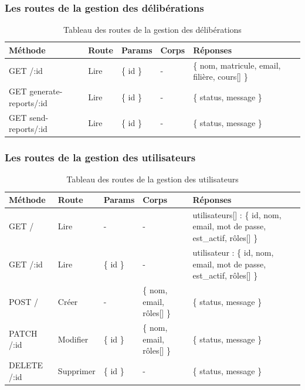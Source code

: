 \subsubsection*{Les routes de la gestion des délibérations}\label{subsec:routes-deliberation}

\begin{table}[ht]
  \caption{Tableau des routes de la gestion des délibérations}
  \label{tab:routes-deliberation}
  \begin{tabular}{|p{2cm}|p{1cm}|p{1cm}|p{1.5cm}|p{4cm}| }
    \hline
    Méthode & Route & Params & Corps & Réponses \\
    \hline
    GET /:id & Lire &  \{ id \} & - & \{ nom, matricule, email, filière, cours[] \} \\
    \hline
    GET generate-reports/:id  & Lire &  \{ id \} & - & \{ status, message \} \\
    \hline
    GET send-reports/:id & Lire &  \{ id \} & - & \{ status, message \} \\
    \hline
  \end{tabular}
\end{table}
\pagebreak

\subsubsection*{Les routes de la gestion des utilisateurs}\label{subsec:routes-user}

\begin{table}[ht]
  \caption{Tableau des routes de la gestion des utilisateurs}
  \label{tab:routes-user}
  \begin{tabular}{|p{1.5cm}|p{1.5cm}|p{1cm}|p{2.5cm}|p{3.5cm}| }
    \hline
    Méthode & Route & Params & Corps & Réponses \\
    \hline
    GET / & Lire & - & - & utilisateurs[] :  \{ id, nom, email, mot de passe, est\_actif, r\^oles[] \} \\
    \hline
    GET /:id & Lire & \{ id \} & - & utilisateur : \{ id, nom, email, mot de passe, est\_actif, r\^oles[] \} \\
    \hline
    POST / & Créer & - & \{ nom, email, r\^oles[] \} & \{ status, message \} \\
    \hline
    PATCH /:id & Modifier & \{ id \} & \{ nom, email, r\^oles[] \} & \{ status, message \} \\
    \hline
    DELETE /:id & Supprimer & \{ id \} & - & \{ status, message \} \\
    \hline
  \end{tabular}
\end{table}
\pagebreak

